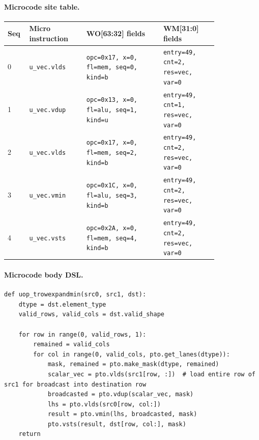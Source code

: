 \paragraph{Microcode site table.}
{\scriptsize
\begin{longtable}{@{}R{0.055\linewidth}L{0.23\linewidth}L{0.31\linewidth}L{0.22\linewidth}@{}}
\toprule
Seq & Micro instruction & WO[63:32] fields & WM[31:0] fields \\
 & \texttt{u\_vec.vlds} & \texttt{opc=0x17, x=0, fl=mem, seq=0, kind=b} & \texttt{entry=49, cnt=2, res=vec, var=0} \\
1 & \texttt{u\_vec.vdup} & \texttt{opc=0x13, x=0, fl=alu, seq=1, kind=u} & \texttt{entry=49, cnt=1, res=vec, var=0} \\
2 & \texttt{u\_vec.vlds} & \texttt{opc=0x17, x=0, fl=mem, seq=2, kind=b} & \texttt{entry=49, cnt=2, res=vec, var=0} \\
3 & \texttt{u\_vec.vmin} & \texttt{opc=0x1C, x=0, fl=alu, seq=3, kind=b} & \texttt{entry=49, cnt=2, res=vec, var=0} \\
4 & \texttt{u\_vec.vsts} & \texttt{opc=0x2A, x=0, fl=mem, seq=4, kind=b} & \texttt{entry=49, cnt=2, res=vec, var=0} \\
\bottomrule
\end{longtable}
}
\paragraph{Microcode body DSL.}
\begin{lstlisting}[style=ptocode]
def uop_trowexpandmin(src0, src1, dst):
    dtype = dst.element_type
    valid_rows, valid_cols = dst.valid_shape

    for row in range(0, valid_rows, 1):
        remained = valid_cols
        for col in range(0, valid_cols, pto.get_lanes(dtype)):
            mask, remained = pto.make_mask(dtype, remained)
            scalar_vec = pto.vlds(src1[row, :])  # load entire row of src1 for broadcast into destination row
            broadcasted = pto.vdup(scalar_vec, mask)
            lhs = pto.vlds(src0[row, col:])
            result = pto.vmin(lhs, broadcasted, mask)
            pto.vsts(result, dst[row, col:], mask)
    return
\end{lstlisting}
\Needspace{0.34\textheight}
